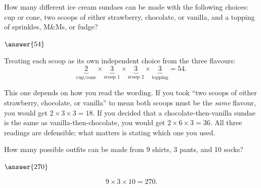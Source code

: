 \documentclass[12pt]{ximera}
\begin{document}
\begin{problem}
How many different ice cream sundaes can be made with the following choices: cup or cone,
two scoops of either strawberry, chocolate, or vanilla, and a topping of sprinkles,
M\&Ms, or fudge?

$\answer{54}$

\begin{freeResponse}
\end{freeResponse}

\begin{solution}
Treating each scoop as its own independent choice from the three flavours:
\[
\underbrace{2}_{\text{cup/cone}} \times \underbrace{3}_{\text{scoop 1}}
\times \underbrace{3}_{\text{scoop 2}} \times \underbrace{3}_{\text{topping}} = 54.
\]

This one depends on how you read the wording. If you took ``two scoops of either
strawberry, chocolate, or vanilla'' to mean both scoops must be the \emph{same} flavour,
you would get $2 \times 3 \times 3 = 18$. If you decided that a chocolate-then-vanilla
sundae is the same as vanilla-then-chocolate, you would get $2 \times 6 \times 3 = 36$.
All three readings are defensible; what matters is stating which one you used.
\end{solution}
\end{problem}

\begin{problem}
How many possible outfits can be made from 9 shirts, 3 pants, and 10 socks?

$\answer{270}$

\begin{solution}
\[
9 \times 3 \times 10 = 270.
\]
\end{solution}
\end{problem}
\end{document}
